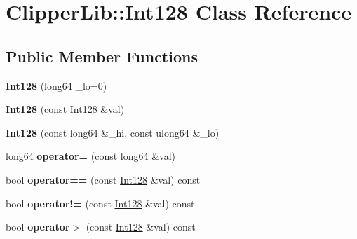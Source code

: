 \hypertarget{classClipperLib_1_1Int128}{\section{Clipper\-Lib\-:\-:Int128 Class Reference}
\label{classClipperLib_1_1Int128}
}
\subsection*{Public Member Functions}
\begin{DoxyCompactItemize}
\item 
\hypertarget{classClipperLib_1_1Int128_acb7953a56e0ddb6d3245268e457f9e37}{{\bfseries Int128} (long64 \-\_\-lo=0)}\label{classClipperLib_1_1Int128_acb7953a56e0ddb6d3245268e457f9e37}

\item 
\hypertarget{classClipperLib_1_1Int128_ad113c3dc3bd371984b05fddb1fe527e2}{{\bfseries Int128} (const \hyperlink{classClipperLib_1_1Int128}{Int128} \&val)}\label{classClipperLib_1_1Int128_ad113c3dc3bd371984b05fddb1fe527e2}

\item 
\hypertarget{classClipperLib_1_1Int128_ac23a17a6a5ea143f0297b7ba0dd1830e}{{\bfseries Int128} (const long64 \&\-\_\-hi, const ulong64 \&\-\_\-lo)}\label{classClipperLib_1_1Int128_ac23a17a6a5ea143f0297b7ba0dd1830e}

\item 
\hypertarget{classClipperLib_1_1Int128_a51ef81c338951a30c55315d43bdf2690}{long64 {\bfseries operator=} (const long64 \&val)}\label{classClipperLib_1_1Int128_a51ef81c338951a30c55315d43bdf2690}

\item 
\hypertarget{classClipperLib_1_1Int128_a9a4597562962e318616a463350c68896}{bool {\bfseries operator==} (const \hyperlink{classClipperLib_1_1Int128}{Int128} \&val) const }\label{classClipperLib_1_1Int128_a9a4597562962e318616a463350c68896}

\item 
\hypertarget{classClipperLib_1_1Int128_a4b79b3e28a4012f87d03fc02969796f9}{bool {\bfseries operator!=} (const \hyperlink{classClipperLib_1_1Int128}{Int128} \&val) const }\label{classClipperLib_1_1Int128_a4b79b3e28a4012f87d03fc02969796f9}

\item 
\hypertarget{classClipperLib_1_1Int128_af34c23b86068c7f065a76dbc1d192269}{bool {\bfseries operator$>$} (const \hyperlink{classClipperLib_1_1Int128}{Int128} \&val) const }\label{classClipperLib_1_1Int128_af34c23b86068c7f065a76dbc1d192269}


\end{DoxyCompactItemize}
